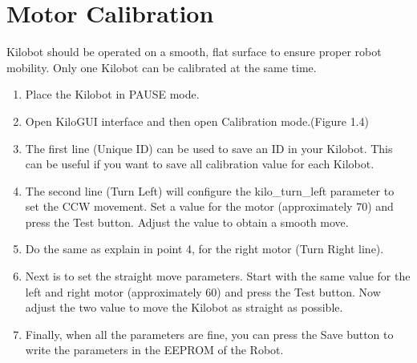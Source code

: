 \documentclass{report}[12pt]
\begin{document}
\section{Motor Calibration}
Kilobot should be operated on a smooth, flat surface to ensure proper robot mobility. Only one Kilobot can be calibrated at the same time. 
\begin{enumerate}
    \item Place the Kilobot in PAUSE mode.
    \item Open KiloGUI interface and then open Calibration mode.(Figure 1.4)
    \item The first line (Unique ID) can be used to save an ID in your Kilobot. This can be useful if you want to save all calibration value for each Kilobot. 
    \item The second line (Turn Left) will configure the kilo\_turn\_left parameter to set the CCW movement. Set  a  value for the motor (approximately 70) and press the Test  button. Adjust the value to obtain a smooth move. 
    \item Do the same as explain in point 4, for the right motor (Turn Right line). 
    \item Next is to set the straight move parameters. Start with the same value for the left and right motor  (approximately 60) and press the Test button. Now adjust the two value to move the Kilobot as straight as possible. 
    \item Finally, when all the parameters are fine, you can press the Save button to write the parameters in the EEPROM of the Robot.
\end{enumerate}
\end{document}
